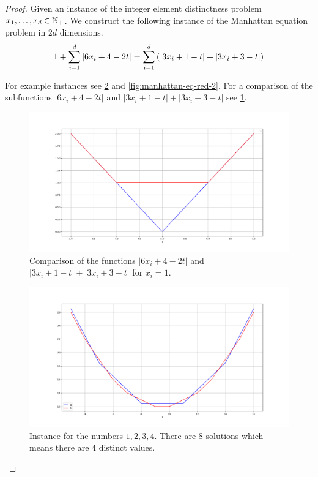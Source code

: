 \begin{proof}
	Given an instance of the integer element distinctness problem \(x_1, \dots, x_d \in \mathbb{N}_+\). We construct the following instance of the Manhattan equation problem in \(2d\) dimensions. 
	\begin{equation}\label{eq:red-eq-manhattan}
		1 + \sum_{i=1}^d |6x_i + 4 - 2t| = \sum_{i=1}^d \left(|3x_i + 1 - t| + |3x_i + 3 - t|\right)
	\end{equation}
	
	For example instances see \cref{fig:manhattan-eq-red-1} and \cref{fig:manhattan-eq-red-2}. For a comparison of the subfunctions \(|6x_i + 4 - 2t|\) and \(|3x_i + 1 - t| + |3x_i + 3 - t|\) see \cref{fig:manhattan-building-block}.

	\begin{figure}
	  \centering
	  \includegraphics[scale=1, width=0.9\linewidth]{figures/manhattan-building-block.png}
	  \caption{Comparison of the functions \(|6x_i + 4 - 2t|\) and \(|3x_i + 1 - t| + |3x_i + 3 - t|\) for \(x_i = 1\).}
	  \label{fig:manhattan-building-block}
	\end{figure}

	\begin{figure}
	  \centering
	  \includegraphics[scale=1, width=0.9\linewidth]{figures/manhattan-eq-red-1.png}
	  \caption{Instance for the numbers \(1,2,3,4\). There are \(8\) solutions which means there are \(4\) distinct values.}
	  \label{fig:manhattan-eq-red-1}
	\end{figure}


\end{proof}
